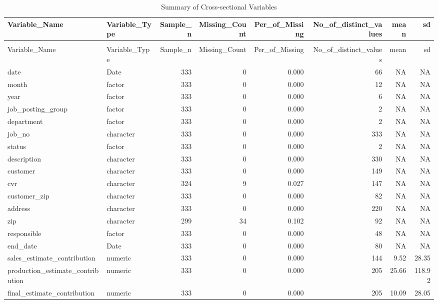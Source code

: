\begingroup\fontsize{9}{11}\selectfont

\begin{landscape}
\begin{longtable}[t]{llrrrrrr}
\caption{Summary of Cross-sectional Variables}\\
\toprule
Variable\_Name & Variable\_Type & Sample\_n & Missing\_Count & Per\_of\_Missing & No\_of\_distinct\_values & mean & sd\\
\midrule
\endfirsthead
\caption[]{Summary of Cross-sectional Variables }\\
\toprule
Variable\_Name & Variable\_Type & Sample\_n & Missing\_Count & Per\_of\_Missing & No\_of\_distinct\_values & mean & sd\\
\midrule
\endhead

\endfoot
\bottomrule
\endlastfoot
date & Date & 333 & 0 & 0.000 & 66 & NA & NA\\
month & factor & 333 & 0 & 0.000 & 12 & NA & NA\\
year & factor & 333 & 0 & 0.000 & 6 & NA & NA\\
job\_posting\_group & factor & 333 & 0 & 0.000 & 2 & NA & NA\\
department & factor & 333 & 0 & 0.000 & 2 & NA & NA\\
job\_no & character & 333 & 0 & 0.000 & 333 & NA & NA\\
status & factor & 333 & 0 & 0.000 & 2 & NA & NA\\
description & character & 333 & 0 & 0.000 & 330 & NA & NA\\
customer & character & 333 & 0 & 0.000 & 149 & NA & NA\\
cvr & character & 324 & 9 & 0.027 & 147 & NA & NA\\
customer\_zip & character & 333 & 0 & 0.000 & 82 & NA & NA\\
address & character & 333 & 0 & 0.000 & 220 & NA & NA\\
zip & character & 299 & 34 & 0.102 & 92 & NA & NA\\
responsible & factor & 333 & 0 & 0.000 & 48 & NA & NA\\
end\_date & Date & 333 & 0 & 0.000 & 80 & NA & NA\\
sales\_estimate\_contribution & numeric & 333 & 0 & 0.000 & 144 & 9.52 & 28.35\\
production\_estimate\_contribution & numeric & 333 & 0 & 0.000 & 205 & 25.66 & 118.92\\
final\_estimate\_contribution & numeric & 333 & 0 & 0.000 & 205 & 10.09 & 28.05\\

\end{longtable}
\end{landscape}
